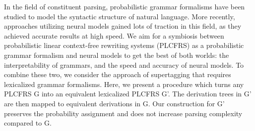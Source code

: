 In the field of constituent parsing, probabilistic grammar formalisms have been studied to model the syntactic structure of natural language. More recently, approaches utilizing neural models gained lots of traction in this field, as they achieved accurate results at high speed. We aim for a symbiosis between probabilistic linear context-free rewriting systems (PLCFRS) as a probabilistic grammar formalism and neural models to get the best of both worlds: the interpretability of grammars, and the speed and accuracy of neural models. To combine these two, we consider the approach of supertagging that requires lexicalized grammar formalisms. Here, we present a procedure which turns any PLCFRS G into an equivalent lexicalized PLCFRS G'. The derivation trees in G' are then mapped to equivalent derivations in G. Our construction for G' preserves the probability assignment and does not increase parsing complexity compared to G.
